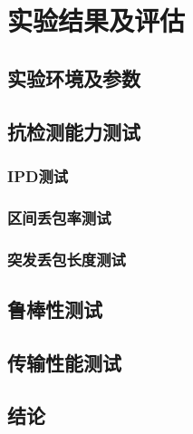 \section{实验结果及评估}
\label{chap:zigzag:results}

\subsection{实验环境及参数}
\label{chap:zigzag:results:environment}

\subsection{抗检测能力测试}
\label{chap:zigzag:results:undetectability}

\subsubsection{IPD测试}
\label{chap:zigzag:results:undetectability:ipd}

\subsubsection{区间丢包率测试}
\label{chap:zigzag:results:undetectability:ipd}

\subsubsection{突发丢包长度测试}
\label{chap:zigzag:results:undetectability:ipd}

\subsection{鲁棒性测试}
\label{chap:zigzag:results:robustness}

\subsection{传输性能测试}
\label{chap:zigzag:results:throughput}

\subsection{结论}
\label{chap:zigzag:results:conclusion}
